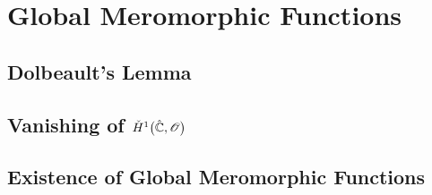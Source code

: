 \documentclass[../Moduli_Spaces_of_Riemann_Surfaces.tex]{subfiles}
\begin{document}
    \section{Global Meromorphic Functions}
    \subsection{Dolbeault's Lemma}
    \subsection{Vanishing of $\check{H}^1\big(\hat{\mathbb{C}},\mathscr{O}\big)$}
    \subsection{Existence of Global Meromorphic Functions}
\end{document}
